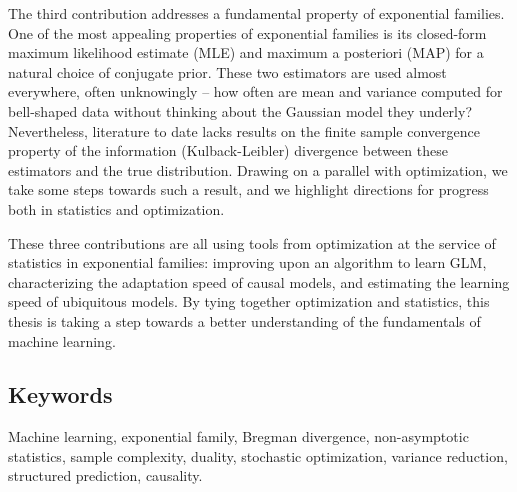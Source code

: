 \documentclass[12pt]{report} %
\numberwithin{equation}{chapter}
\numberwithin{table}{chapter}
\numberwithin{figure}{chapter}
\begin{document}
The third contribution addresses a fundamental property of exponential families.
One of the most appealing properties of exponential families is its closed-form maximum likelihood estimate (MLE) and maximum a posteriori (MAP) for a natural choice of conjugate prior. These two estimators are used almost everywhere, often unknowingly
-- how often are mean and variance computed for bell-shaped data without thinking about the Gaussian model they underly?
Nevertheless, literature to date lacks results on the finite sample convergence property of the information (Kulback-Leibler) divergence between these estimators and the true distribution.
Drawing on a parallel with optimization, we take some steps towards such a result, and we highlight directions for progress both in statistics and optimization.

These three contributions are all using tools from optimization at the service of statistics in exponential families: improving upon an algorithm to learn GLM, characterizing the adaptation speed of causal models, and estimating the learning speed of ubiquitous models.
By tying together optimization and statistics, this thesis is taking a step towards a better understanding of the fundamentals of machine learning.

\subsection*{Keywords}
Machine learning, exponential family, Bregman divergence, non-asymptotic statistics, sample complexity, duality, stochastic optimization, variance reduction, structured prediction, causality.



\cleardoublepage
{}  %
\tableofcontents
\cleardoublepage
{}  %
\listoftables
\cleardoublepage
{}
\listoffigures

\end{document}
